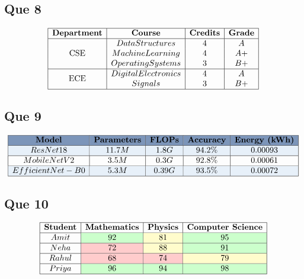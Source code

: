 \documentclass[12pt,a4paper]{article}
\begin{document}
	\subsection*{Que 8}
	
	\[
	\begin{array}{|c|c|c|c|}
		\hline
		\textbf{Department} & \textbf{Course} & \textbf{Credits} & \textbf{Grade}\\
		\hline
		\multirow{3}{*}{CSE}
		& Data Structures & 4 & A\\
		& Machine Learning & 4 & A+\\
		& Operating Systems & 3 & B+\\
		\hline
		\multirow{2}{*}{ECE}
		& Digital Electronics & 4 & A\\
		& Signals & 3 & B+\\
		\hline
	\end{array}
	\]
	
	\subsection*{Que 9}
	
	\[
	\begin{array}{|c|c|c|c|c|}
		\hline
		\rowcolor{headerblue}
		\textbf{Model} & \textbf{Parameters} & \textbf{FLOPs} &
		\textbf{Accuracy} & \textbf{Energy (kWh)}\\
		\hline
		\rowcolor{lightblue}
		ResNet18 & 11.7M & 1.8G & 94.2\% & 0.00093\\
		\hline
		MobileNetV2 & 3.5M & 0.3G & 92.8\% & 0.00061\\
		\hline
		\rowcolor{lightblue}
		EfficientNet-B0 & 5.3M & 0.39G & 93.5\% & 0.00072\\
		\hline
	\end{array}
	\]
	
	\subsection*{Que 10}
	
	\[
	\begin{array}{|c|c|c|c|}
		\hline
		\textbf{Student} & \textbf{Mathematics} &
		\textbf{Physics} & \textbf{Computer Science}\\
		\hline
		Amit &
		\cellcolor{green!20}92 &
		\cellcolor{yellow!20}81 &
		\cellcolor{green!20}95\\
		\hline
		Neha &
		\cellcolor{red!20}72 &
		\cellcolor{yellow!20}88 &
		\cellcolor{green!20}91\\
		\hline
		Rahul &
		\cellcolor{red!20}68 &
		\cellcolor{red!20}74 &
		\cellcolor{yellow!20}79\\
		\hline
		Priya &
		\cellcolor{green!20}96 &
		\cellcolor{green!20}94 &
		\cellcolor{green!20}98\\
		\hline
	\end{array}
	\]
\end{document}
